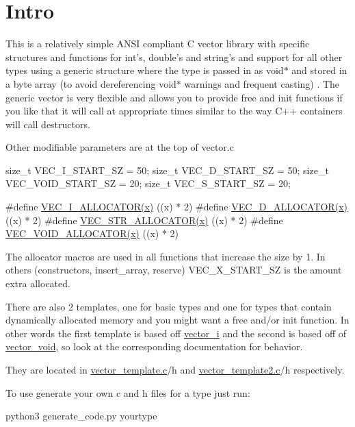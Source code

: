 \hypertarget{index_Intro}{}\section{Intro}\label{index_Intro}
This is a relatively simple A\-N\-S\-I compliant C vector library with specific structures and functions for int's, double's and string's and support for all other types using a generic structure where the type is passed in as void$\ast$ and stored in a byte array (to avoid dereferencing void$\ast$ warnings and frequent casting) . The generic vector is very flexible and allows you to provide free and init functions if you like that it will call at appropriate times similar to the way C++ containers will call destructors.

Other modifiable parameters are at the top of vector.\-c 
\begin{DoxyPre}
size\_t VEC\_I\_START\_SZ = 50;
size\_t VEC\_D\_START\_SZ = 50;
size\_t VEC\_VOID\_START\_SZ = 20;
size\_t VEC\_S\_START\_SZ = 20;\end{DoxyPre}



\begin{DoxyPre}#define \hyperlink{vector__i_8c_a6d9a8fd1aaa4a8df09d79da016a5c5aa}{VEC\_I\_ALLOCATOR(x)} ((x) * 2)
#define \hyperlink{vector__d_8c_a024a194564bd2419ca1ac75e3cdec3e8}{VEC\_D\_ALLOCATOR(x)} ((x) * 2)
#define \hyperlink{vector__str_8c_ac6b46abc3594994ede1811c5268fa72f}{VEC\_STR\_ALLOCATOR(x)} ((x) * 2)
#define \hyperlink{vector__void_8c_a6f86fe931c02dfbb3d901d2f5e5ec969}{VEC\_VOID\_ALLOCATOR(x)} ((x) * 2)
\end{DoxyPre}
 The allocator macros are used in all functions that increase the size by 1. In others (constructors, insert\-\_\-array, reserve) V\-E\-C\-\_\-\-X\-\_\-\-S\-T\-A\-R\-T\-\_\-\-S\-Z is the amount extra allocated.

There are also 2 templates, one for basic types and one for types that contain dynamically allocated memory and you might want a free and/or init function. In other words the first template is based off \hyperlink{structvector__i}{vector\-\_\-i} and the second is based off of \hyperlink{structvector__void}{vector\-\_\-void}, so look at the corresponding documentation for behavior.

They are located in \hyperlink{vector__template_8c}{vector\-\_\-template.\-c}/h and \hyperlink{vector__template2_8c}{vector\-\_\-template2.\-c}/h respectively.

To use generate your own c and h files for a type just run\-: 
\begin{DoxyPre}
python3 generate\_code.py yourtype
\end{DoxyPre}


